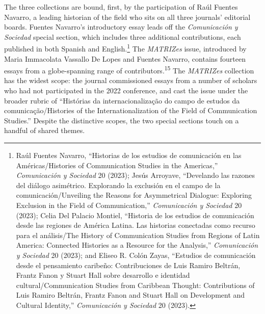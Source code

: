 \documentclass{tufte-handout}
\begin{document}
The three collections are bound, first, by the participation of Raúl
Fuentes Navarro, a leading historian of the field who sits on all three
journals' editorial boards. Fuentes Navarro's introductory essay leads
off the \emph{Comunicación y Sociedad} special section, which includes
three additional contributions, each published in both Spanish and
English.\footnote{Raúl Fuentes Navarro, ``Historias de los estudios de
  comunicación en las Américas/Histories of Communication Studies in the
  Americas,'' \emph{Comunicación y Sociedad} 20 (2023); Jesús Arroyave, ``Develando las razones del diálogo asimétrico. Explorando la
  exclusión en el campo de la comunicación/Unveiling the Reasons for
  Asymmetrical Dialogue: Exploring Exclusion in the Field of
  Communication,'' \emph{Comunicación y Sociedad} 20 (2023); Celia Del
  Palacio Montiel, ``Historia de los estudios de comunicación desde las
  regiones de América Latina. Las historias conectadas como recurso para
  el análisis/The History of Communication Studies from Regions of Latin
  America: Connected Histories as a Resource for the Analysis,''
  \emph{Comunicación y Sociedad} 20 (2023); and Eliseo R. Colón Zayas,
  ``Estudios de comunicación desde el pensamiento caribeño:
  Contribuciones de Luis Ramiro Beltrán, Frantz Fanon y Stuart Hall
  sobre desarrollo e identidad cultural/Communication Studies from
  Caribbean Thought: Contributions of Luis Ramiro Beltrán, Frantz Fanon
  and Stuart Hall on Development and Cultural Identity,''
  \emph{Comunicación y Sociedad} 20 (2023).} The \emph{MATRIZes} issue,
introduced by Maria Immacolata Vassallo De Lopes and Fuentes Navarro,
contains fourteen essays from a globe-spanning range of
contributors.\textsuperscript{15} The \emph{MATRIZes} collection
has the widest scope: the journal commissioned essays from a number of
scholars who had not participated in the 2022 conference, and cast the
issue under the broader rubric of ``Histórias da internacionalização do
campo de estudos da comunicação/Histories of the Internationalization of
the Field of Communication Studies.'' Despite the distinctive scopes,
the two special sections touch on a handful of shared themes.
\end{document}
